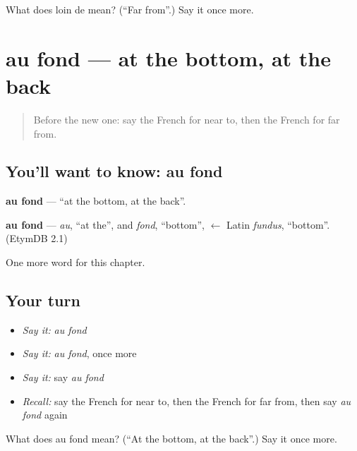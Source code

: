 \begin{tcolorbox}[breakable,colback=teal!4,colframe=teal!35!black,title={Before you move on}]
What does loin de mean? (\textquotedblleft{}Far from\textquotedblright{}.) Say it once more.
\end{tcolorbox}
\section[au fond]{au fond — at the bottom, at the back}

\label{lesson:FR-C188-au-fond}



\begin{quote}
Before the new one: say the French for near to, then the French for far from.
\end{quote}

\subsection*{You'll want to know: au fond}
\textbf{au fond} — \textquotedblleft{}at the bottom, at the back\textquotedblright{}.

\begin{cousinweb}
\textbf{au fond} — \emph{au}, \textquotedblleft{}at the\textquotedblright{}, and \emph{fond}, \textquotedblleft{}bottom\textquotedblright{}, $\leftarrow$ Latin \emph{fundus}, \textquotedblleft{}bottom\textquotedblright{}. (EtymDB 2.1)
\end{cousinweb}

\begin{grammarlens}[title={What you've built}]
One more word for this chapter.
\end{grammarlens}

\subsection*{Your turn}
\begin{itemize}
\raggedright
  \item \emph{Say it:} \emph{au fond}
  \item \emph{Say it:} \emph{au fond}, once more
  \item \emph{Say it:} say \emph{au fond}
  \item \emph{Recall:} say the French for near to, then the French for far from, then say \emph{au fond} again
\end{itemize}

\begin{tcolorbox}[breakable,colback=teal!4,colframe=teal!35!black,title={Before you move on}]
What does au fond mean? (\textquotedblleft{}At the bottom, at the back\textquotedblright{}.) Say it once more.
\end{tcolorbox}
